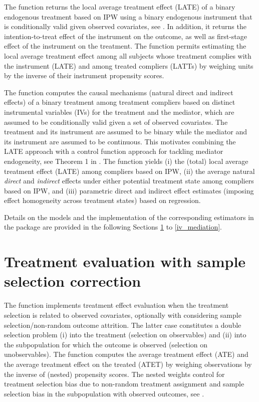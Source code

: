 \documentclass[nojss]{jss}
\begin{document}
The function  returns the local average treatment effect (LATE) of a binary endogenous treatment based on IPW using a binary endogenous instrument that is conditionally valid given observed covariates, see \citet{Fr07}. In addition, it returns the intention-to-treat effect of the instrument on the outcome, as well as first-stage effect of the instrument on the treatment. The function  permits estimating the local average treatment effect among all subjects whose treatment complies with the instrument (LATE) and among treated compliers (LATTs) by weighing units by the inverse of their instrument propensity scores.

The function  computes the causal mechanisms (natural direct and indirect effects) of a binary treatment among treatment compliers based on distinct instrumental variables (IVs) for the treatment and the mediator, which are assumed to be conditionally valid given a set of observed covariates. The treatment and its instrument are assumed to be binary while the mediator and its instrument are assumed to be continuous. This motivates combining the LATE approach with a control function approach for tackling mediator endogeneity, see Theorem 1 in \citet{FrHu17}. The function  yields (i) the (total) local average treatment effect (LATE) among compliers based on IPW, (ii) the average natural \emph{direct} and \emph{indirect} effects under either potential treatment state among compliers based on IPW, and (iii) parametric direct and indirect effect estimates (imposing effect homogeneity across treatment states) based on regression.

Details on the models and the implementation of the corresponding estimators in the  package are provided in the following Sections \ref{sample selection} to \ref{iv_mediation}.

\section{Treatment evaluation with sample selection correction}\label{sample selection}

The function  implements treatment effect evaluation when the treatment selection is related to observed covariates, optionally with considering sample selection/non-random outcome attrition. The latter case constitutes a double selection problem (i) into the treatment (selection on observables) and (ii) into the subpopulation for which the outcome is observed (selection on unobservables). The function  computes the average treatment effect (ATE) and the average treatment effect on the treated (ATET) by weighing observations by the inverse of (nested) propensity scores. The nested weights control for  treatment selection bias due to non-random treatment assignment and sample selection bias in the subpopulation with observed outcomes, see \citet{Hu12,Hu14}.
\end{document}
